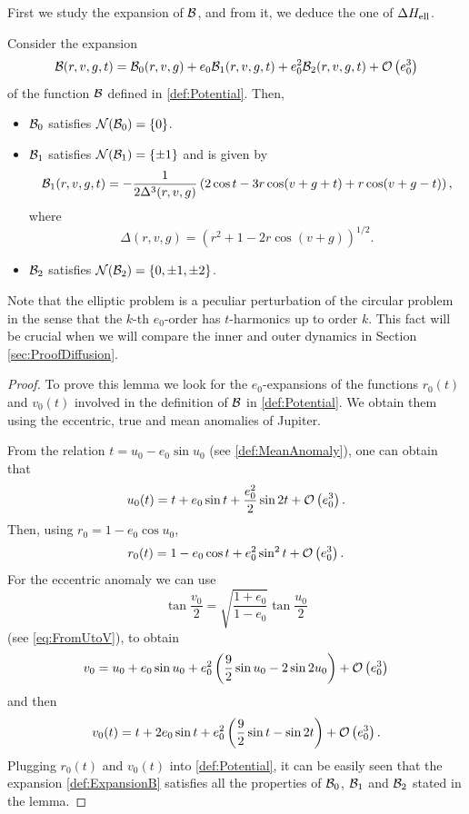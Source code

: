 
First we study the expansion of $\mathcal{B}$, and from it, we deduce the one of $\Delta H_{\mathrm{ell}}$.
\begin{lemma}\label{lemma:ExpansionB}
  Consider the expansion
  \begin{equation}\label{def:ExpansionB}
    \mathcal{B}(r,v, g, t)= \mathcal{B}_0(r,v,g)+e_0 \mathcal{B}_1(r,v,g, t)+e_0^2 \mathcal{B}_2(r,v, g, t)+\mathcal{O}\left(e_0^3\right)
  \end{equation}
  of the function $\mathcal{B}$ defined in \eqref{def:Potential}. Then,
  \begin{itemize}
  \item $\mathcal{B}_0$ satisfies  $\mathcal{N}(\mathcal{B}_0)=\{0\}$.
  \item $\mathcal{B}_1$ satisfies $\mathcal{N}(\mathcal{B}_1)=\{\pm 1\}$ and is given by
    \begin{equation}\label{def:B1}
      \mathcal{B}_1(r,v,g, t)=-\frac{1}{2\Delta^3(r,v,g)}\left(2\cos t-3r \cos(v+g+t)+r\cos(v+g-t)\right),
    \end{equation}
    where
    \[
    \Delta(r,v,g)=\left(r^2+1-2r\cos (v+g)\right)^{1/2}.
    \]
  \item $\mathcal{B}_2$ satisfies $\mathcal{N}(\mathcal{B}_2)=\{0,\pm 1,\pm 2\}$.
  \end{itemize}
\end{lemma}
Note that the elliptic problem is a peculiar perturbation of
the circular problem in the sense that the $k$-th $e_0$-order has $t$-harmonics
up to order $k$. This fact will be crucial when we will compare the inner and outer
dynamics in Section \ref{sec:ProofDiffusion}.


\begin{proof}
  To prove this lemma we look for   the $e_0$-expansions of the functions $r_0(t)$
  and $v_0(t)$ involved in the definition of $\mathcal{B}$ in \eqref{def:Potential}. We obtain
  them using the eccentric, true and mean anomalies of Jupiter.

  From the relation $t=u_0-e_0\sin u_0$ (see \eqref{def:MeanAnomaly}), one can obtain that
  \[
  u_0(t)=t+e_0\sin t+\frac{e_0^2}{2}\sin 2t+\mathcal{O}\left(e_0^3\right).
  \]
  Then, using $r_0=1-e_0\cos u_0$,
  \[
  r_0(t)=1-e_0\cos t+e_0^2\sin^2 t+\mathcal{O}\left(e_0^3\right).
  \]
  For the eccentric anomaly we can use
  \[
  \tan\frac{v_0}{2}=\sqrt{\frac{1+e_0}{1-e_0}}\tan\frac{u_0}{2}
  \]
  (see \eqref{eq:FromUtoV}), to obtain
  \[
  v_0=u_0+e_0\sin u_0+e_0^2\left(\frac{9}{2}\sin u_0-2\sin 2u_0\right)+\mathcal{O}\left(e_0^3\right)
  \]
  and then
  \[
  v_0(t)=t+2e_0\sin t+e^2_0\left(\frac{9}{2}\sin t-\sin 2t\right)+\mathcal{O}\left(e_0^3\right).
  \]
  Plugging $r_0(t)$ and $v_0(t)$ into \eqref{def:Potential}, it can be easily seen that
  the expansion \eqref{def:ExpansionB} satisfies all the properties of $\mathcal{B}_0$, $\mathcal{B}_1$ and $\mathcal{B}_2$
  stated in the lemma.
\end{proof}



